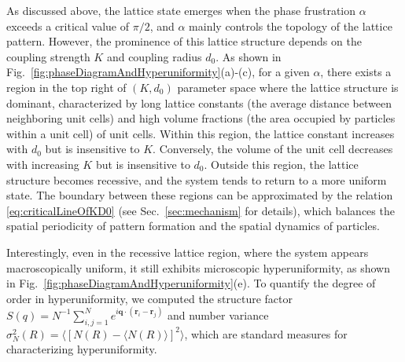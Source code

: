 \documentclass{article}
\begin{document}
As discussed above, the lattice state emerges when the phase frustration $\alpha$ exceeds a critical value of $\pi/2$, and $\alpha$ mainly controls the topology of the lattice pattern.
However, the prominence of this lattice structure depends on the coupling strength $K$ and coupling radius $d_0$.
As shown in Fig.~\ref{fig:phaseDiagramAndHyperuniformity}(a)-(c), for a given $\alpha$, there exists a region in the top right of $(K, d_0)$ parameter space where the lattice structure is dominant, characterized by long lattice constants (the average distance between neighboring unit cells) and high volume fractions (the area occupied by particles within a unit cell) of unit cells.
Within this region, the lattice constant increases with $d_0$ but is insensitive to $K$. Conversely, the volume of the unit cell decreases with increasing $K$ but is insensitive to $d_0$.
Outside this region, the lattice structure becomes recessive, and the system tends to return to a more uniform state. The boundary between these regions can be approximated by the relation \eqref{eq:criticalLineOfKD0} (see Sec.~\ref{sec:mechanism} for details), which balances the spatial periodicity of pattern formation and the spatial dynamics of particles.

Interestingly, even in the recessive lattice region, where the system appears macroscopically uniform, it still exhibits microscopic hyperuniformity, as shown in Fig.~\ref{fig:phaseDiagramAndHyperuniformity}(e).
To quantify the degree of order in hyperuniformity, we computed the structure factor $S(q)=N^{-1}\sum_{i,j=1}^{N}e^{i\mathbf{q}\cdot(\mathbf{r}_i-\mathbf{r}_j)}$ and number variance $\sigma _N^2(R)=\langle \left[ N\left( R \right) -\langle N\left( R \right) \rangle \right] ^2\rangle $, which are standard measures for characterizing hyperuniformity\cite{TORQUATO20181}. 


\end{document}
